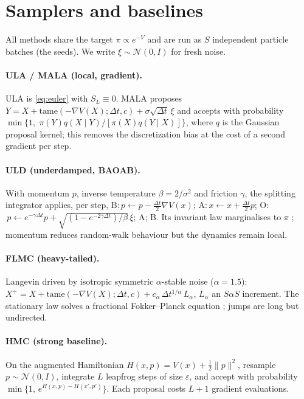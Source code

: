 \documentclass[11pt]{article}
\theoremstyle{plain}
\theoremstyle{remark}
\begin{document}
\section{Samplers and baselines}\label{sec:samplers}
All methods share the target $\pi\propto e^{-V}$ and are run as $S$ independent
particle batches (the seeds). We write $\xi\sim\mathcal N(0,I)$ for fresh noise.

\paragraph{ULA / MALA (local, gradient).}
ULA is \eqref{eq:euler} with $S_L\equiv0$. MALA proposes
$Y=X+\mathrm{tame}(-\nabla V(X);\Delta t,c)+\sigma\sqrt{\Delta t}\,\xi$ and accepts
with probability $\min\{1,\;\pi(Y)q(X\mid Y)/[\pi(X)q(Y\mid X)]\}$, where $q$ is
the Gaussian proposal kernel; this removes the discretization bias at the cost of a
second gradient per step.

\paragraph{ULD (underdamped, BAOAB).}
With momentum $p$, inverse temperature $\beta=2/\sigma^2$ and friction $\gamma$, the
splitting integrator applies, per step, B:$\,p\!\leftarrow\!p-\tfrac{\Delta t}{2}\nabla V(x)$;
A:$\,x\!\leftarrow\!x+\tfrac{\Delta t}{2}p$;
O:$\,p\!\leftarrow\!e^{-\gamma\Delta t}p+\sqrt{(1-e^{-2\gamma\Delta t})/\beta}\,\xi$;
A; B. Its invariant law marginalises to $\pi$ \cite{leimkuhler2013}; momentum
reduces random-walk behaviour but the dynamics remain local.

\paragraph{FLMC (heavy-tailed).}
Langevin driven by isotropic symmetric $\alpha$-stable noise ($\alpha=1.5$):
$X^{+}=X+\mathrm{tame}(-\nabla V(X);\Delta t,c)+c_\alpha\,\Delta t^{1/\alpha}\,L_\alpha$,
$L_\alpha$ an $S\alpha S$ increment. The stationary law solves a fractional
Fokker--Planck equation \cite{simsekli2017}; jumps are long but undirected.

\paragraph{HMC (strong baseline).}
On the augmented Hamiltonian $H(x,p)=V(x)+\tfrac12\|p\|^2$, resample
$p\sim\mathcal N(0,I)$, integrate $L$ leapfrog steps of size $\varepsilon$, and
accept with probability $\min\{1,\,e^{H(x,p)-H(x',p')}\}$. Each proposal costs
$L{+}1$ gradient evaluations.
\end{document}
